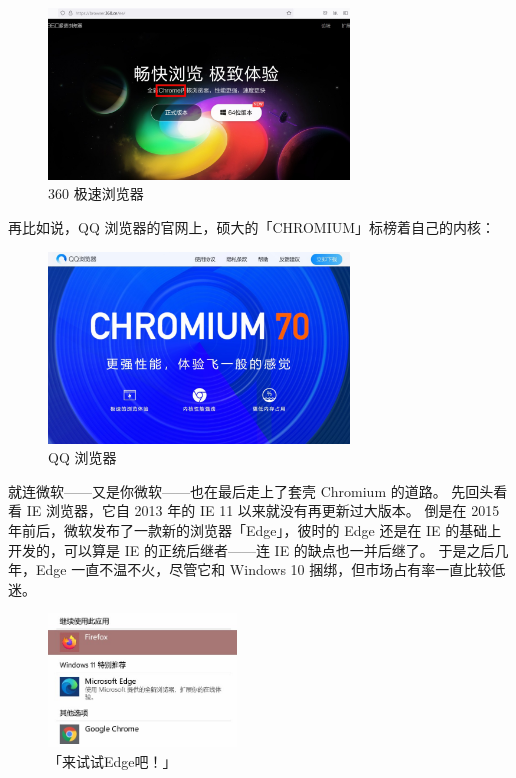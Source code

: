 \begin{figure}[htb!]
  \centering
  \includegraphics[width=8cm]{assets/360_ee.jpg}
  \caption{360 极速浏览器}
  \label{360_ee}
\end{figure}

再比如说，QQ 浏览器的官网上，硕大的「CHROMIUM」标榜着自己的内核：

\begin{figure}[htb!]
  \centering
  \includegraphics[width=8cm]{assets/QQ_Browser.jpg}
  \caption{QQ 浏览器}
  \label{QQ_Browser}
\end{figure}

就连微软——又是你微软——也在最后走上了套壳 Chromium 的道路。
先回头看看 IE 浏览器，它自 2013 年的 IE 11 以来就没有再更新过大版本。
倒是在 2015 年前后，微软发布了一款新的浏览器「Edge」，彼时的 Edge 还是在 IE 的基础上开发的，可以算是 IE 的正统后继者——连 IE 的缺点也一并后继了。
于是之后几年，Edge 一直不温不火，尽管它和 Windows 10 捆绑，但市场占有率一直比较低迷。

\begin{figure}
  \centering
  \includegraphics[width=5cm]{assets/Recommend_Edge.jpg}
  \caption{「来试试Edge吧！」}
  \label{Recommend_Edge}
\end{figure}

